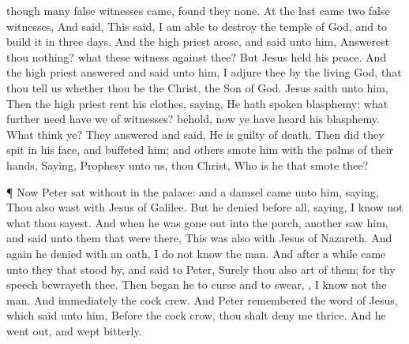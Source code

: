 {though
many false
witnesses
came,
{} found
they
none. At the
last
came
two false
witnesses,
And
said,
This
{}
said, I am
able to
destroy the
temple of
God,
and to
build
it
in
three
days.
And the high
priest
arose, and
said unto
him, Answerest
thou
nothing?
what
{}
these witness
against
thee?
But
Jesus held his
peace.
And the high
priest
answered and
said unto
him, I
adjure
thee
by
the
living
God,
that thou
tell
us
whether
thou
be the
Christ, the
Son of
God.
Jesus
saith unto
him,
{}
Then the high
priest
rent
his
clothes,
saying, He hath spoken
blasphemy;
what
further
need have
we of
witnesses?
behold,
now ye have
heard
his
blasphemy.
What
think
ye? They
answered
and
said, He
is guilty
of
death.
Then did they
spit
in
his
face,
and
buffeted
him;
and
others smote him with the palms of their
hands,
Saying,
Prophesy unto
us, thou
Christ,
Who is
he that
smote
thee?
\par }{\PP {}¶ Now
Peter
sat
without
in the
palace:
and
a
damsel came
unto
him,
saying,
Thou
also
wast
with
Jesus of
Galilee.
But he
denied
before
{}
all,
saying, I
know
not
what thou
sayest.
And
when
he was gone
out
into the
porch,
another
{}
saw
him,
and
said unto them that were
there,
This
{}
was
also
with
Jesus of
Nazareth.
And
again he
denied
with an
oath, I
do
not
know the
man.
And
after a
while came
unto
{} they that stood
by, and
said to
Peter,
Surely
thou
also
art
{}
of
them;
for
thy
speech
bewrayeth
thee.
Then began
he to
curse
and to
swear,
{}, I
know
not the
man.
And
immediately the
cock
crew.
And
Peter
remembered the
word of
Jesus, which
said unto
him,
Before the
cock
crow, thou shalt
deny
me
thrice.
And he
went
out, and
wept
bitterly.

}
